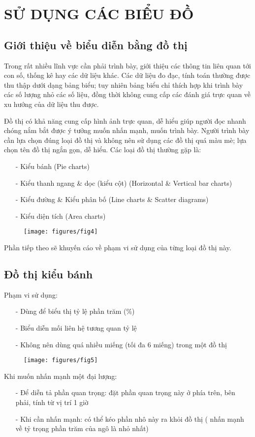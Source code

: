 \chapter{SỬ DỤNG CÁC BIỂU ĐỒ}
\label{chap:bieudo}


\section{Giới thiệu về biểu diễn bằng đồ thị}
\label{sec:dothi}
Trong rất nhiều lĩnh vực cần phải trình bày, giới thiệu các thông tin liên quan tới con số, thống kê hay các dữ liệu khác. Các dữ liệu đo đạc, tính toán thường được thu thập dưới dạng bảng biểu; tuy nhiên bảng biểu chỉ thích hợp khi trình bày các số lượng nhỏ các số liệu, đồng thời không cung cấp các đánh giá trực quan về xu hướng của dữ liệu thu được.

Đồ thị có khả năng cung cấp hình ảnh trực quan, dễ hiểu giúp người đọc nhanh chóng nắm bắt được ý tưởng muốn nhấn mạnh, muốn trình bày. Người trình bày cần lựa chọn đúng loại đồ thị và không nên sử dụng các đồ thị quá màu mè; lựa chọn tên đồ thị ngắn gọn, dễ hiểu. Các loại đồ thị thường gặp là:
\begin{itemize}
	\item[-] Kiểu bánh (Pie charts)
	\item[-] Kiểu thanh ngang \& dọc (kiểu cột) (Horizontal \& Vertical bar charts)
	\item[-] Kiểu đường \& Kiểu phân bố (Line charts \& Scatter diagrams)
	\item[-] Kiểu diện tích (Area charts)
\end{itemize}

\begin{figure}[h]
\centering
	\texttt{[image: figures/fig4]}
\end{figure}

Phần tiếp theo sẽ khuyến cáo về phạm vi sử dụng của từng loại đồ thị này.
\section{Đồ thị kiểu bánh}
\label{sec:banh}
Phạm vi sử dụng:
\begin{itemize}
	\item[-] Dùng để biểu thị tỷ lệ phần trăm (\%)
	\item[-] Biểu diễn mối liên hệ tương quan tỷ lệ
	\item[-] Không nên dùng quá nhiều miếng (tối đa 6 miếng) trong một đồ thị
\end{itemize}
\begin{figure}[h]
\centering
	\texttt{[image: figures/fig5]}
\end{figure}
Khi muốn nhấn mạnh một đại lượng:
\begin{itemize}
 \item[-] Để diễn tả phần quan trọng: đặt phần quan trọng này ở phía trên, bên phải, tính từ vị trí 1 giờ
 \item[-] Khi cần nhấn mạnh: có thể kéo phần nhô này ra khỏi đồ thị ( nhấn mạnh về tỷ trọng phần trăm của ngô là nhỏ nhất)
\end{itemize}


